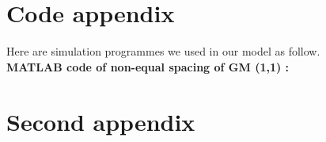 \begin{appendices}
	
	\section*{Code appendix} %
	
	Here are simulation programmes we used in our model as follow.\\
	
	
	
	\textbf{\textcolor[rgb]{0.98,0.00,0.00}{MATLAB code of non-equal spacing of GM (1,1) :}}
	

	\section*{Second appendix}
	
	
\end{appendices}